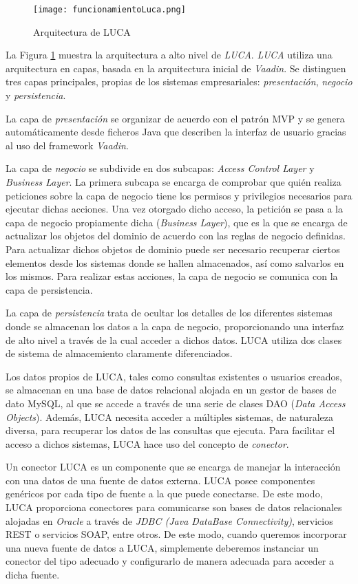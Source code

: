 \begin{figure}[H]
	\centering
	\texttt{[image: funcionamientoLuca.png]}
	\caption{Arquitectura de LUCA}
    \label{fig:funcionamientoLuca}
\end{figure}

La Figura \ref{fig:funcionamientoLuca} muestra la arquitectura a alto nivel de \emph{LUCA}. \emph{LUCA} utiliza una arquitectura en capas, basada en la arquitectura inicial de \emph{Vaadin}. Se distinguen tres capas principales, propias de los sistemas empresariales: \emph{presentación}, \emph{negocio} y \emph{persistencia}.

La capa de \emph{presentación} se organizar de acuerdo con el patrón MVP y se genera automáticamente desde ficheros Java que describen la interfaz de usuario gracias al uso del framework \emph{Vaadin}.

La capa de \emph{negocio} se subdivide en dos subcapas: \emph{Access Control Layer} y \emph{Business Layer}. La primera subcapa se encarga de comprobar que quién realiza peticiones sobre la capa de negocio tiene los permisos y privilegios necesarios para ejecutar dichas acciones. Una vez otorgado dicho acceso, la petición se pasa a la capa de negocio propiamente dicha (\emph{Business Layer}), que es la que se encarga de actualizar los objetos del dominio de acuerdo con las reglas de negocio definidas. Para actualizar dichos objetos de dominio puede ser necesario recuperar ciertos elementos desde los sistemas donde se hallen almacenados, así como salvarlos en los mismos. Para realizar estas acciones, la capa de negocio se comunica con la capa de persistencia. 

La capa de \emph{persistencia} trata de ocultar los detalles de los diferentes sistemas donde se almacenan los datos a la capa de negocio, proporcionando una interfaz de alto nivel a través de la cual acceder a dichos datos. LUCA utiliza dos clases de sistema de almacemiento claramente diferenciados. 

Los datos propios de LUCA, tales como consultas existentes o usuarios creados, se almacenan en una base de datos relacional alojada en un gestor de bases de dato MySQL, al que se accede a través de una serie de clases DAO (\emph{Data Access Objects}). Además, LUCA necesita acceder a múltiples sistemas, de naturaleza diversa, para recuperar los datos de las consultas que ejecuta. Para facilitar el acceso a dichos sistemas, LUCA hace uso del concepto de \emph{conector}.

Un conector LUCA es un componente que se encarga de manejar la interacción con una datos de una fuente de datos externa. LUCA posee componentes genéricos por cada tipo de fuente a la que puede conectarse. De este modo, LUCA proporciona conectores para comunicarse son bases de datos relacionales alojadas en \emph{Oracle} a través de \emph{JDBC (Java DataBase Connectivity)}, servicios REST o servicios SOAP, entre otros. De este modo, cuando queremos incorporar una nueva fuente de datos a LUCA, simplemente deberemos instanciar un conector del tipo adecuado y configurarlo de manera adecuada para acceder a dicha fuente.







